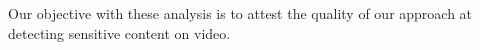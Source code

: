 

Our objective with these analysis is to attest the quality of our approach at detecting sensitive content on video.
 
